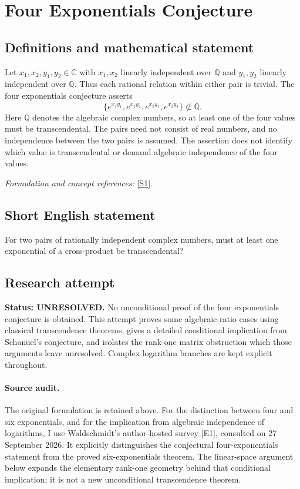 \documentclass[11pt]{article}
\begin{document}
\section*{\texorpdfstring{Four Exponentials Conjecture}{Four Exponentials Conjecture}}\label{1281}
\subsection{Definitions and mathematical statement}
Let $x_1,x_2,y_1,y_2\in{\mathbb{C}}$ with $x_1,x_2$ linearly independent over ${\mathbb{Q}}$ and $y_1,y_2$ linearly independent over ${\mathbb{Q}}$. Thus each rational relation within either pair is trivial. The four exponentials conjecture asserts
\[
 \{e^{x_1y_1},e^{x_1y_2},e^{x_2y_1},e^{x_2y_2}\}
 \not\subset\overline{{\mathbb{Q}}}.
\]
Here $\overline{{\mathbb{Q}}}$ denotes the algebraic complex numbers, so at least one of the four values must be transcendental. The pairs need not consist of real numbers, and no independence between the two pairs is assumed. The assertion does not identify which value is transcendental or demand algebraic independence of the four values.
\par\smallskip\textit{Formulation and concept references:} \href{https://mathworld.wolfram.com/FourExponentialsConjecture.html}{[S1]}.

\subsection{Short English statement}
For two pairs of rationally independent complex numbers, must at least one exponential of a cross-product be transcendental?
\subsection{Research attempt}
\textbf{Status: UNRESOLVED.} No unconditional proof of the four exponentials conjecture is obtained. This attempt proves some algebraic-ratio cases using classical transcendence theorems, gives a detailed conditional implication from Schanuel's conjecture, and isolates the rank-one matrix obstruction which those arguments leave unresolved. Complex logarithm branches are kept explicit throughout.

\paragraph{Source audit.}
The original formulation is retained above. For the distinction between four and six exponentials, and for the implication from algebraic independence of logarithms, I use Waldschmidt's author-hosted survey [E1], consulted on 27 September 2026. It explicitly distinguishes the conjectural four-exponentials statement from the proved six-exponentials theorem. The linear-space argument below expands the elementary rank-one geometry behind that conditional implication; it is not a new unconditional transcendence theorem.
\end{document}

